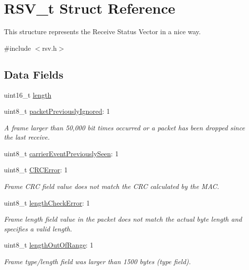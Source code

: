 \hypertarget{struct_r_s_v__t}{}\section{R\+S\+V\+\_\+t Struct Reference}
\label{struct_r_s_v__t}


This structure represents the Receive Status Vector in a nice way.  




{\ttfamily \#include $<$rsv.\+h$>$}

\subsection*{Data Fields}
\begin{DoxyCompactItemize}
\item 
uint16\+\_\+t \mbox{\hyperlink{struct_r_s_v__t_a1892eba2086d12ac2b09005aeb09ea3b}{length}}
\item 
uint8\+\_\+t \mbox{\hyperlink{struct_r_s_v__t_a91c26b9645e5edca1e4c4f13c76631a2}{packet\+Previously\+Ignored}}\+: 1
\begin{DoxyCompactList}\small\item\em A frame larger than 50,000 bit times occurred or a packet has been dropped since the last receive. \end{DoxyCompactList}\item 
uint8\+\_\+t \mbox{\hyperlink{struct_r_s_v__t_a009a3b631b303f95d25e18876d2bcf6c}{carrier\+Event\+Previously\+Seen}}\+: 1
\item 
uint8\+\_\+t \mbox{\hyperlink{struct_r_s_v__t_a331925f67a8efb3a251601448de7b1eb}{C\+R\+C\+Error}}\+: 1
\begin{DoxyCompactList}\small\item\em Frame C\+RC field value does not match the C\+RC calculated by the M\+AC. \end{DoxyCompactList}\item 
uint8\+\_\+t \mbox{\hyperlink{struct_r_s_v__t_aa1ee2560cad39e2579609aa0bbe23622}{length\+Check\+Error}}\+: 1
\begin{DoxyCompactList}\small\item\em Frame length field value in the packet does not match the actual byte length and specifies a valid length. \end{DoxyCompactList}\item 
uint8\+\_\+t \mbox{\hyperlink{struct_r_s_v__t_addceef1c25a3a79f0809d2088d7fad31}{length\+Out\+Of\+Range}}\+: 1
\begin{DoxyCompactList}\small\item\em Frame type/length field was larger than 1500 bytes (type field). \end{DoxyCompactList}\item 

\end{DoxyCompactItemize}
